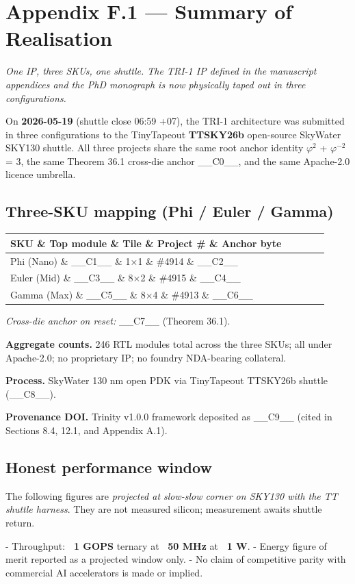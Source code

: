 
\section{Appendix F.1 --- Summary of Realisation}

\textit{One IP, three SKUs, one shuttle. The TRI-1 IP defined in the manuscript appendices and the PhD monograph is now physically taped out in three configurations.}

On \textbf{2026-05-19} (shuttle close 06:59 +07), the TRI-1 architecture was submitted in three configurations to the TinyTapeout \textbf{TTSKY26b} open-source SkyWater SKY130 shuttle. All three projects share the same root anchor identity $\varphi^{2}$ + $\varphi^{-2}$ = 3, the same Theorem 36.1 cross-die anchor \_\_C0\_\_, and the same Apache-2.0 licence umbrella.

\subsection{Three-SKU mapping (Phi / Euler / Gamma)}

\begin{tabular}{|l|l|l|l|l|}
\hline
SKU \& Top module \& Tile \& Project \# \& Anchor byte \\
\hline
Phi (Nano) \& \_\_C1\_\_ \& 1$\times$1 \& \#4914 \& \_\_C2\_\_ \\
Euler (Mid) \& \_\_C3\_\_ \& 8$\times$2 \& \#4915 \& \_\_C4\_\_ \\
Gamma (Max) \& \_\_C5\_\_ \& 8$\times$4 \& \#4913 \& \_\_C6\_\_ \\
\hline
\end{tabular}
\textit{Cross-die anchor on reset:} \_\_C7\_\_ (Theorem 36.1).

\textbf{Aggregate counts.} 246 RTL modules total across the three SKUs; all under Apache-2.0; no proprietary IP; no foundry NDA-bearing collateral.

\textbf{Process.} SkyWater 130 nm open PDK via TinyTapeout TTSKY26b shuttle (\_\_C8\_\_).

\textbf{Provenance DOI.} Trinity v1.0.0 framework deposited as \_\_C9\_\_ (cited in Sections 8.4, 12.1, and Appendix A.1).

\subsection{Honest performance window}

The following figures are \textit{projected at slow-slow corner on SKY130 with the TT shuttle harness}. They are not measured silicon; measurement awaits shuttle return.

- Throughput: \textbf{~1 GOPS} ternary at \textbf{~50 MHz} at \textbf{~1 W}.
- Energy figure of merit reported as a projected window only.
- No claim of competitive parity with commercial AI accelerators is made or implied.